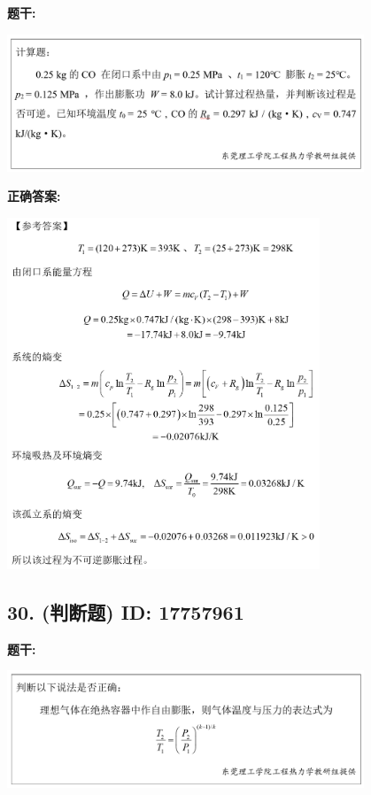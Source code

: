 \documentclass[12pt]{article}
\begin{document}
\textbf{题干:}


\begin{center}\includegraphics[width=0.8\textwidth, height=0.25\textheight, keepaspectratio]{question_29_17757967/title_img_1.png}\end{center}

\textbf{正确答案:}

\begin{center}\includegraphics[width=0.7\textwidth, height=0.2\textheight, keepaspectratio]{question_29_17757967/correct_answer_1_img_1.png}\end{center}

\vspace{0.5em}\hrulefill\vspace{1em}

\subsection*{30. (判断题) \small ID: 17757961}

\textbf{题干:}


\begin{center}\includegraphics[width=0.8\textwidth, height=0.25\textheight, keepaspectratio]{question_30_17757961/title_img_1.png}\end{center}
\end{document}
